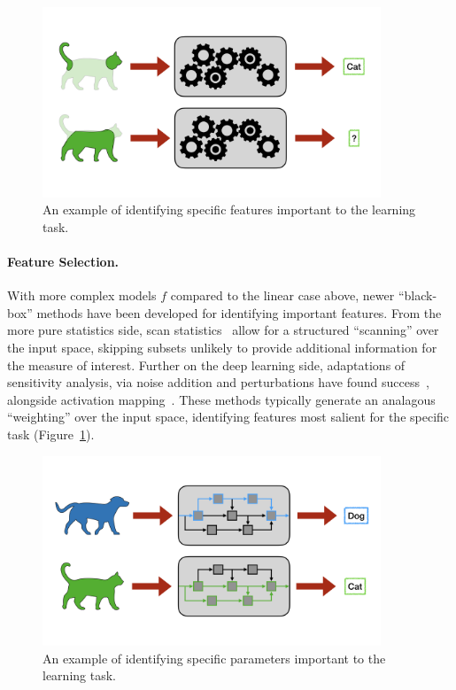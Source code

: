 \begin{figure}
    \centering
    \includegraphics[trim={0 3cm 0 3cm},clip,width=0.9\textwidth]{diss/1_intro/figs/feat_select.png}
    \caption[Visualization of feature selection]{An example of identifying specific features important to the learning task.}
    \label{fig:feat_select}
\end{figure}
\paragraph{Feature Selection.} 
With more complex models $f$ compared to the linear case above, newer ``black-box'' methods have been developed for identifying important features. From the more pure statistics side, scan statistics~\cite{scanstat,scanstatlrt} allow for a structured ``scanning'' over the input space, skipping subsets unlikely to provide additional information for the measure of interest.
Further on the deep learning side, adaptations of sensitivity analysis, via noise addition and perturbations have found success~\citep{yeung2010sensitivity,zhang2015sensitivity}, alongside activation mapping~\citep{cam,selvaraju2017grad}.
These methods typically generate an analagous ``weighting'' over the input space, identifying features most salient for the specific task (Figure~\ref{fig:feat_select}).

\begin{figure}
    \centering
    \includegraphics[trim={0 3cm 0 3cm},clip,width=0.9\textwidth]{diss/1_intro/figs/param_select.png}
    \caption[Visualization of parameter selection]{An example of identifying specific parameters important to the learning task.}
    \label{fig:param_select}
\end{figure}
